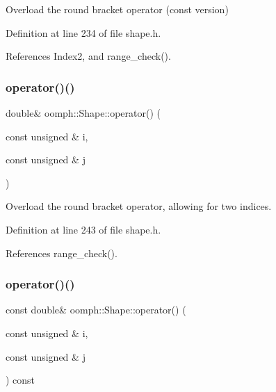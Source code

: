 Overload the round bracket operator (const version) 



Definition at line 234 of file shape.\+h.



References Index2, and range\+\_\+check().

\mbox{\label{classoomph_1_1Shape_ab95188f5eed67514d5bf577bfacda57e}} 
\subsubsection{\texorpdfstring{operator()()}{operator()()}\hspace{0.1cm}{\footnotesize\ttfamily [3/4]}}
{\footnotesize\ttfamily double\& oomph\+::\+Shape\+::operator() (\begin{DoxyParamCaption}\item[{const unsigned \&}]{i,  }\item[{const unsigned \&}]{j }\end{DoxyParamCaption})\hspace{0.3cm}{\ttfamily [inline]}}



Overload the round bracket operator, allowing for two indices. 



Definition at line 243 of file shape.\+h.



References range\+\_\+check().

\mbox{\label{classoomph_1_1Shape_aca2aaf2e793bced412831a26d3b8e8c7}} 
\subsubsection{\texorpdfstring{operator()()}{operator()()}\hspace{0.1cm}{\footnotesize\ttfamily [4/4]}}
{\footnotesize\ttfamily const double\& oomph\+::\+Shape\+::operator() (\begin{DoxyParamCaption}\item[{const unsigned \&}]{i,  }\item[{const unsigned \&}]{j }\end{DoxyParamCaption}) const\hspace{0.3cm}{\ttfamily [inline]}}



